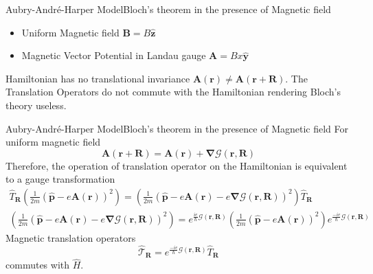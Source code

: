 \documentclass{beamer}
\begin{document}
\begin{frame}{Aubry-Andr\'{e}-Harper Model}{Bloch's theorem in the presence of Magnetic field}
 \begin{itemize}
  \item Uniform Magnetic field $\mathbf{B} = B\hat{\mathbf{z}}$
  \item Magnetic Vector Potential in Landau gauge $\mathbf{A} = Bx\hat{\mathbf{y}}$
 \end{itemize}
Hamiltonian has no translational invariance $\mathbf{A}(\mathbf{r}) \neq \mathbf{A}(\mathbf{r} + \mathbf{R})$.
The Translation Operators do not commute with the Hamiltonian rendering Bloch's theory useless.
\end{frame}

\begin{frame}{Aubry-Andr\'{e}-Harper Model}{Bloch's theorem in the presence of Magnetic field}
 \small For uniform magnetic field
 \begin{equation*}
 \mathbf{A}(\mathbf{r} + \mathbf{R}) = \mathbf{A}(\mathbf{r}) + \bm{\nabla}\mathcal{G}(\mathbf{r}, \mathbf{R})
\end{equation*}
Therefore, the operation of translation operator on the Hamiltonian is equivalent to a gauge transformation
\begin{gather*}
 \hat{T}_{\mathbf{R}}\left(\frac{1}{2m}(\hat{\mathbf{p}} - e\mathbf{A}(\mathbf{r}))^2\right) = \left(\frac{1}{2m}(\hat{\mathbf{p}} - e\mathbf{A}(\mathbf{r}) - e\bm{\nabla}\mathcal{G}(\mathbf{r}, \mathbf{R}))^2\right)\hat{T}_{\mathbf{R}} \\
 \label{chap_6:magneticgaugetransform}\left(\frac{1}{2m}(\hat{\mathbf{p}} - e\mathbf{A}(\mathbf{r}) - e\bm{\nabla}\mathcal{G}(\mathbf{r}, \mathbf{R}))^2\right) = e^{\frac{ie}{\hbar}\mathcal{G}(\mathbf{r}, \mathbf{R})}\left(\frac{1}{2m}(\hat{\mathbf{p}} - e\mathbf{A}(\mathbf{r}))^2\right)e^{\frac{-ie}{\hbar}\mathcal{G}(\mathbf{r}, \mathbf{R})}
\end{gather*}
\alert{Magnetic translation operators}
\begin{equation*}
 \hat{\mathcal{T}}_{\mathbf{R}} = e^{\frac{-ie}{\hbar}\mathcal{G}(\mathbf{r}, \mathbf{R})}\hat{T}_{\mathbf{R}}
\end{equation*} commutes with $\hat{H}$.
\normalsize
\end{frame}
\end{document}
